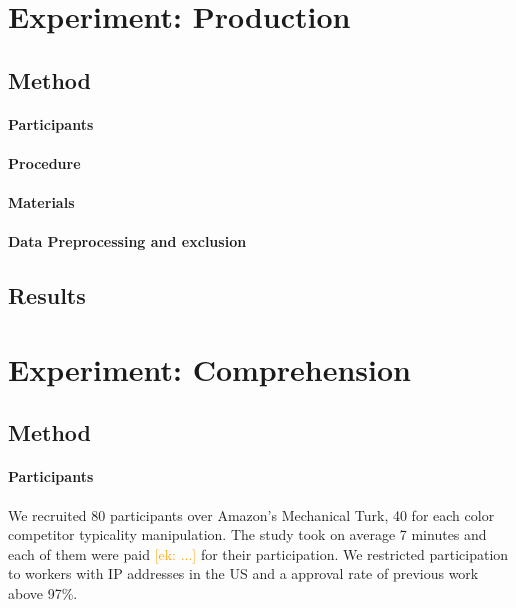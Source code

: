 \documentclass[a4paper,man,floatsintext,natbib,donotrepeattitle]{apa6}
\newcommand{\ek}[1]{\textcolor{Orange}{[ek: #1]}}
\begin{document}


\section{Experiment: Production} \label{experiment}

\subsection{Method}

\paragraph{Participants}

\paragraph{Procedure}

\paragraph{Materials}

\paragraph{Data Preprocessing and exclusion}

\subsection{Results}

\section{Experiment: Comprehension} \label{experiment}

\subsection{Method}

\paragraph{Participants}
We recruited 80 participants over Amazon's Mechanical Turk, 40 for each color competitor typicality manipulation. The study took on average 7 minutes and each of them were paid \ek{...} for their participation. We restricted participation to workers with IP addresses in the US and a approval rate of previous work above 97\%.
\end{document}
